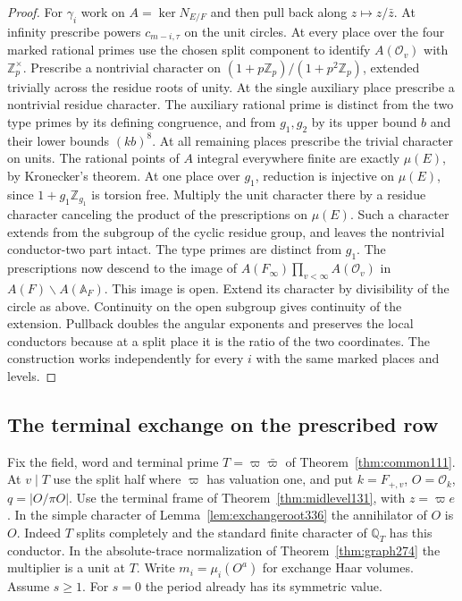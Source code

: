 \documentclass[a4paper,11pt]{article}
\theoremstyle{definition}
\theoremstyle{remark}
\newcommand{\ZZ}{\mathbb Z}\newcommand{\ord}{\operatorname{ord}}
\numberwithin{equation}{section}
\begin{document}
\begin{proof}
For \(\gamma_i\) work on \(A=\ker N_{E/F}\) and then pull
back along \(z\mapsto z/\bar z\). At infinity prescribe powers
\(c_{m-i,\tau}\) on the unit circles. At every place over the
four marked rational primes use the chosen split component to
identify \(A(\mathcal O_v)\) with \(\ZZ_p^\times\). Prescribe
a nontrivial character on \((1+p\ZZ_p)/(1+p^2\ZZ_p)\), extended
trivially across the residue roots of unity. At the single
auxiliary place prescribe a nontrivial residue character.
The auxiliary rational prime is distinct from the two type primes
by its defining congruence, and from \(g_1,g_2\) by its upper
bound \(b\) and their lower bounds \((kb)^8\).
At all remaining places prescribe the trivial character on
units. The rational points of \(A\) integral everywhere finite
are exactly \(\mu(E)\), by Kronecker's theorem. At one place
over \(g_1\), reduction is injective on \(\mu(E)\), since
\(1+g_1\ZZ_{g_1}\) is torsion free. Multiply the unit character
there by a residue character canceling the product of the
prescriptions on \(\mu(E)\). Such a character extends from
the subgroup of the cyclic residue group, and leaves the
nontrivial conductor-two part intact. The type primes are
distinct from \(g_1\). The prescriptions now descend to the
image of \(A(F_\infty)\prod_{v<\infty}A(\mathcal O_v)\) in
\(A(F)\backslash A(\mathbb A_F)\). This image is open. Extend
its character by divisibility of the circle as above. Continuity
on the open subgroup gives continuity of the extension.
Pullback doubles the angular exponents and preserves the local
conductors because at a split place it is the ratio of the two
coordinates. The construction works independently for every
\(i\) with the same marked places and levels.
\end{proof}

\subsection{The terminal exchange on the prescribed row}\label{sec:terminalexchange336}
Fix the field, word and terminal prime \(T=\varpi\bar\varpi\)
of Theorem~\ref{thm:common111}. At \(v\mid T\) use the split
half where \(\varpi\) has valuation one, and put \(k=F_{+,v}\),
\(O=\mathcal O_k\), \(q=|O/\pi O|\). Use the terminal frame
of Theorem~\ref{thm:midlevel131}, with \(z=\varpi e\).
In the simple character of Lemma~\ref{lem:exchangeroot336} the
annihilator of \(O\) is \(O\). Indeed \(T\) splits completely
and the standard finite character of \(\mathbb Q_T\) has this
conductor. In the absolute-trace normalization of
Theorem~\ref{thm:graph274} the multiplier is a unit at \(T\).
Write \(m_i=\mu_i(O^a)\) for exchange Haar volumes. Assume \(s\ge1\).
For \(s=0\) the period already has its symmetric value.
\end{document}
